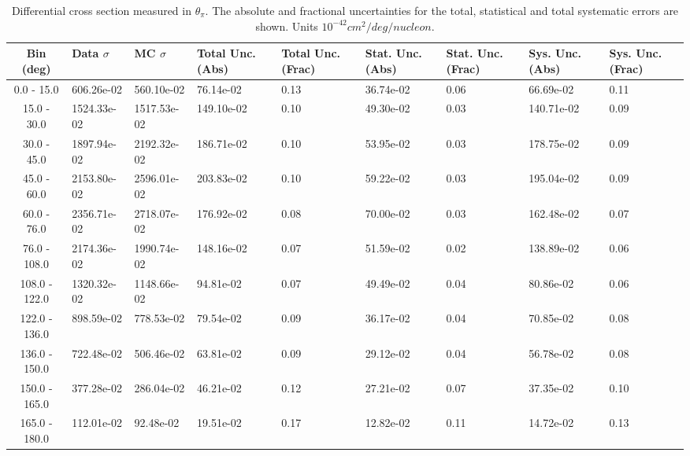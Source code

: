 \begin{table}[!htb]
    \centering
    \tiny
    \begin{tabular}{|c|p{0.5in}|p{0.5in}|p{0.5in}|p{0.5in}|p{0.5in}|p{0.5in}|p{0.5in}|p{0.5in}|}
        \hline
        Bin (deg)& Data $\sigma$ & MC $\sigma$ & Total Unc. (Abs) & Total Unc. (Frac)  & Stat. Unc. (Abs) & Stat. Unc. (Frac) & Sys. Unc. (Abs) & Sys. Unc. (Frac)\\ \hline
0.0 - 15.0 & 606.26e-02 & 560.10e-02 & 76.14e-02 & 0.13 & 36.74e-02 & 0.06 & 66.69e-02 & 0.11\\ \hline
15.0 - 30.0 & 1524.33e-02 & 1517.53e-02 & 149.10e-02 & 0.10 & 49.30e-02 & 0.03 & 140.71e-02 & 0.09\\ \hline
30.0 - 45.0 & 1897.94e-02 & 2192.32e-02 & 186.71e-02 & 0.10 & 53.95e-02 & 0.03 & 178.75e-02 & 0.09\\ \hline
45.0 - 60.0 & 2153.80e-02 & 2596.01e-02 & 203.83e-02 & 0.10 & 59.22e-02 & 0.03 & 195.04e-02 & 0.09\\ \hline
60.0 - 76.0 & 2356.71e-02 & 2718.07e-02 & 176.92e-02 & 0.08 & 70.00e-02 & 0.03 & 162.48e-02 & 0.07\\ \hline
76.0 - 108.0 & 2174.36e-02 & 1990.74e-02 & 148.16e-02 & 0.07 & 51.59e-02 & 0.02 & 138.89e-02 & 0.06\\ \hline
108.0 - 122.0 & 1320.32e-02 & 1148.66e-02 & 94.81e-02 & 0.07 & 49.49e-02 & 0.04 & 80.86e-02 & 0.06\\ \hline
122.0 - 136.0 & 898.59e-02 & 778.53e-02 & 79.54e-02 & 0.09 & 36.17e-02 & 0.04 & 70.85e-02 & 0.08\\ \hline
136.0 - 150.0 & 722.48e-02 & 506.46e-02 & 63.81e-02 & 0.09 & 29.12e-02 & 0.04 & 56.78e-02 & 0.08\\ \hline
150.0 - 165.0 & 377.28e-02 & 286.04e-02 & 46.21e-02 & 0.12 & 27.21e-02 & 0.07 & 37.35e-02 & 0.10\\ \hline
165.0 - 180.0 & 112.01e-02 & 92.48e-02 & 19.51e-02 & 0.17 & 12.82e-02 & 0.11 & 14.72e-02 & 0.13\\ \hline

    \end{tabular}
    \caption{Differential cross section measured in $\theta_\pi$. The absolute and fractional uncertainties for the total, statistical and total systematic errors are shown. Units $10^{-42}cm^2/deg/nucleon$.}
    \label{tab:ApdxA:XSecTable1Dthetapi}
\end{table}



